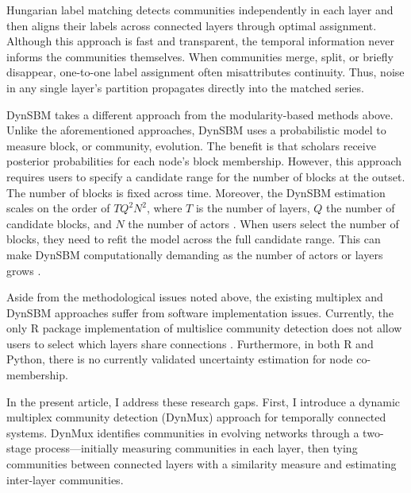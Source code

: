 \documentclass[11pt, letterpaper]{article}
\begin{document}
Hungarian label matching detects communities independently in each layer and then aligns their labels across connected layers through optimal assignment. Although this approach is fast and transparent, the temporal information never informs the communities themselves. When communities merge, split, or briefly disappear, one-to-one label assignment often misattributes continuity. Thus, noise in any single layer's partition propagates directly into the matched series.

DynSBM takes a different approach from the modularity-based methods above. Unlike the aforementioned approaches, DynSBM uses a probabilistic model to measure block, or community, evolution. The benefit is that scholars receive posterior probabilities for each node's block membership. %
However, this approach requires users to specify a candidate range for the number of blocks at the outset. The number of blocks is fixed across time. Moreover, the DynSBM estimation scales on the order of $TQ^2N^2$, where $T$ is the number of layers, $Q$ the number of candidate blocks, and $N$ the number of actors \citep{matias2017statistical}.  When users select the number of blocks, they need to refit the model across the full candidate range. This can make DynSBM computationally demanding as the number of actors or layers grows \citep{matias2017statistical, ludkin2018dynamic}.

Aside from the methodological issues noted above, the existing multiplex and DynSBM approaches suffer from software implementation issues. Currently, the only R package implementation of multislice community detection does not allow users to select which layers share connections \citep{magnani2021analysis}. Furthermore, in both R and Python, there is no currently validated uncertainty estimation for node co-membership.

In the present article, I address these research gaps. First, I introduce a dynamic multiplex community detection (DynMux) approach for temporally connected systems. DynMux identifies communities in evolving networks through a two-stage process---initially measuring communities in each layer, then tying communities between connected layers with a similarity measure and estimating inter-layer communities.
\end{document}
